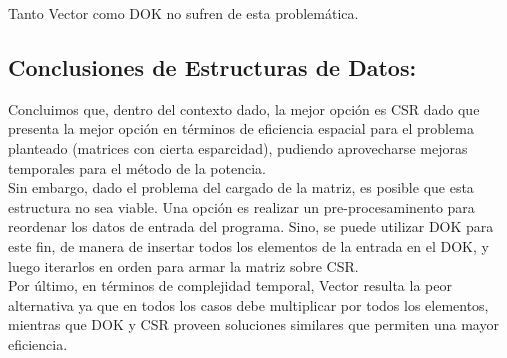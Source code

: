Tanto Vector como DOK no sufren de esta problemática.

\subsection{Conclusiones de Estructuras de Datos:}

Concluimos que, dentro del contexto dado, la mejor opción es CSR dado que presenta la mejor opción en términos de eficiencia espacial para el problema planteado (matrices con cierta esparcidad), pudiendo aprovecharse mejoras temporales para el método de la potencia.\\
Sin embargo, dado el problema del cargado de la matriz, es posible que esta estructura no sea viable. Una opción es realizar un pre-procesaminento para reordenar los datos de entrada del programa. Sino, se puede utilizar DOK para este fin, de manera de insertar todos los elementos de la entrada en el DOK, y luego iterarlos en orden para armar la matriz sobre CSR.\\
Por último, en términos de complejidad temporal, Vector resulta la peor alternativa ya que en todos los casos debe multiplicar por todos los elementos, mientras que DOK y CSR proveen soluciones similares que permiten una mayor eficiencia.
